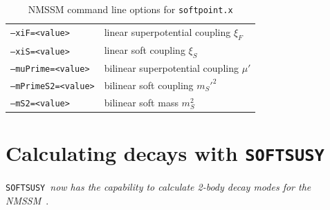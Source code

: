 \documentclass[final,3p,times]{elsarticle}
\def\SOFTSUSY{{\tt SOFTSUSY}}
\def\code#1{\small{\tt #1}\normalsize}
\begin{document}
\begin{table}[tbh]
\begin{tabular}{ll}
    \code{--xiF=<value>} & linear superpotential coupling $\xi_F$ \\
    \code{--xiS=<value>} & linear soft coupling $\xi_S$ \\
    \code{--muPrime=<value>} & bilinear superpotential coupling $\mu'$ \\
    \code{--mPrimeS2=<value>} & bilinear soft coupling $m_{S}'^2$ \\
    \code{--mS2=<value>} & bilinear soft mass $m_{S}^2$ \\
    \hline
  \end{tabular}
  \caption{NMSSM command line options for \code{softpoint.x}}
  \label{tab:nmssm-cmd-line-options}
\end{table}

\section{Calculating decays with \SOFTSUSY\label{sec:decays}}
\SOFTSUSY\ {\em now has the capability to calculate 2-body decay modes for the
NMSSM}~\cite{Allanach:2017hcf}. 
\end{document}
